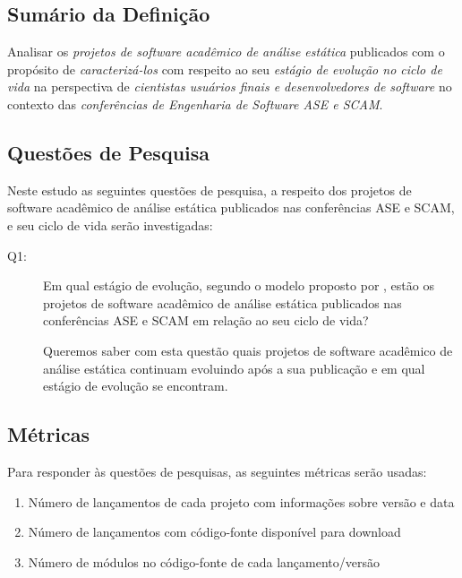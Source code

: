 \subsection{Sumário da Definição}

Analisar os \textit{projetos de software acadêmico de análise estática} publicados
com o propósito de \textit{caracterizá-los}
com respeito ao seu \textit{estágio de evolução no ciclo de vida}
na perspectiva de \textit{cientistas usuários finais e desenvolvedores de software}
no contexto das \textit{conferências de Engenharia de Software ASE e SCAM}.

\subsection{Questões de Pesquisa}

Neste estudo as seguintes questões de pesquisa, a respeito dos projetos de
software acadêmico de análise estática publicados nas conferências ASE e SCAM,
e seu ciclo de vida serão investigadas:

\newcommand{\EstudoTresQuestaoUm}{
  Em qual estágio de evolução, segundo o modelo proposto por \citeonline{capiluppi2007adapting}, estão os projetos de software acadêmico de
  análise estática publicados nas conferências ASE e SCAM em relação ao seu
  ciclo de vida?
}

\begin{description}
  \item [Q1:] \EstudoTresQuestaoUm

    Queremos saber com esta questão quais projetos de software acadêmico de
    análise estática continuam evoluindo após a sua publicação e em qual estágio
    de evolução se encontram.
\end{description}

\subsection{Métricas}

Para responder às questões de pesquisas, as seguintes métricas serão usadas:

\begin{enumerate}
  \item Número de lançamentos de cada projeto com informações sobre versão e data
  \item Número de lançamentos com código-fonte disponível para download
  \item Número de módulos no código-fonte de cada lançamento/versão
\end{enumerate}

